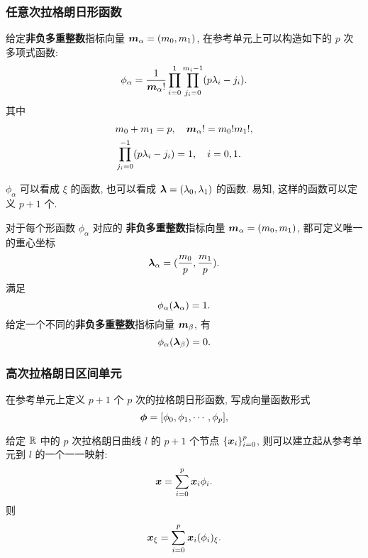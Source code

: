 \documentclass{beamer}
\numberwithin{subsection}{section}
\begin{document}
\begin{frame}
    \frametitle{任意次拉格朗日形函数}

    给定{\bf 非负多重整数}指标向量 ${\boldsymbol m}_\alpha = (m_0, m_1)$, 在参考单元上可以构造如下的 $p$ 次多项式函数:
    \begin{equation}
        \phi_{\alpha} = \frac{1}{{\boldsymbol m}_\alpha!}\prod_{i=0}^{1}\prod_{j_i =
        0}^{m_i - 1} (p\lambda_i - j_i).
        \label{eq:phi}
    \end{equation}
    其中
    \begin{align*}
        &m_0 + m_1 = p,\quad {\boldsymbol m}_\alpha! = m_0!m_1!, \\
        &\prod_{j_i=0}^{-1}(p\lambda_i - j_i) = 1,\quad i = 0, 1.
    \end{align*}
    \begin{remark}
        $\phi_{\alpha}$ 可以看成 $\xi$ 的函数, 也可以看成 ${\bm \lambda}
        = (\lambda_0, \lambda_1)$ 的函数. 易知, 这样的函数可以定义
        $p+1$ 个.
    \end{remark}
\end{frame}

\begin{frame}
    对于每个形函数 $\phi_\alpha$ 对应的 {\bf 非负多重整数}指标向量 ${\boldsymbol m}_\alpha
    = (m_0, m_1)$, 都可定义唯一的重心坐标
    $$
        {\bm \lambda}_\alpha = (\frac{m_0}{p}, \frac{m_1}{p}).
    $$
    满足
    \begin{equation*}
        \phi_\alpha({\bm \lambda}_\alpha) = 1.
    \end{equation*}
    给定一个不同的{\bf 非负多重整数}指标向量 ${\boldsymbol m}_\beta$, 有
    \begin{equation*}
        \phi_\alpha({\bm \lambda}_\beta) = 0.
    \end{equation*}
\end{frame} 

\begin{frame}
    \frametitle{高次拉格朗日区间单元}
    在参考单元上定义 $p+1$ 个 $p$ 次的拉格朗日形函数, 写成向量函数形式
    $$
        {\bm \phi} = [\phi_0, \phi_1, \cdots, \phi_p],
    $$

    给定 ${\mathbb R}$ 中的 $p$ 次拉格朗日曲线 $l$ 的 $p+1$ 个节点
    $\{{\boldsymbol x}_i\}_{i=0}^{p}$, 则可以建立起从参考单元到 $l$ 的一个一一映射:
    \begin{equation*}
        {\boldsymbol x} = \sum_{i=0}^{p}{\boldsymbol x}_i\phi_i.
    \end{equation*}
    则
    \begin{align*}
        {\boldsymbol x}_\xi = \sum_{i=0}^{p}{\boldsymbol x}_i(\phi_i)_\xi.
    \end{align*}
\end{frame}
\end{document}
